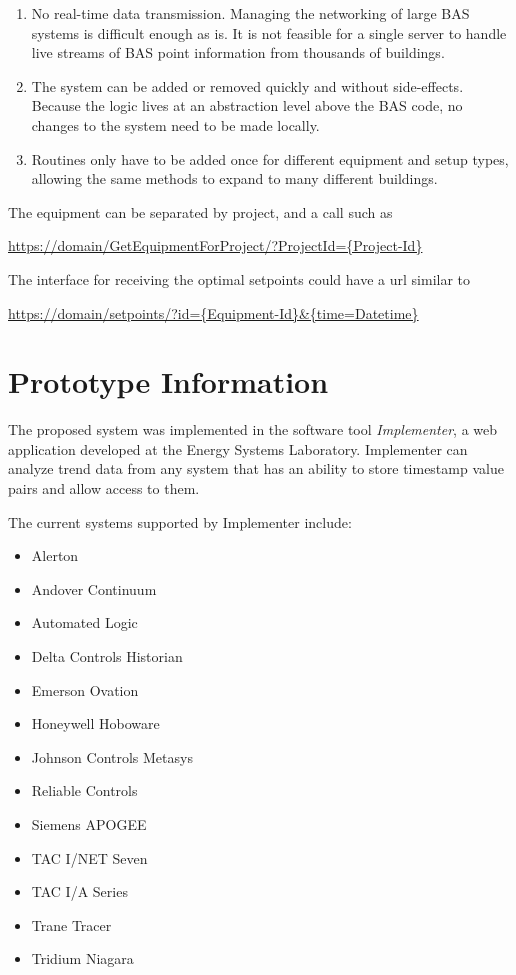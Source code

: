 \begin{enumerate}
    \item No real-time data transmission. Managing the networking of large BAS systems is difficult enough as is. It is not feasible for a single server to handle live streams of BAS point information from thousands of buildings. 

    \item The system can be added or removed quickly and without side-effects. Because the logic lives at an abstraction level above the BAS code, no changes to the system need to be made locally. 

    \item Routines only have to be added once for different equipment and setup types, allowing the same methods to expand to many different buildings. 


\end{enumerate}

The equipment can be separated by project, and a call such as

\url{https://domain/GetEquipmentForProject/?ProjectId={Project-Id}}

The interface for receiving the optimal setpoints could have a url
similar to 

\url{https://domain/setpoints/?id={Equipment-Id}\&{time=Datetime}}

\section{Prototype Information}

The proposed system was implemented in the software tool
\textit{Implementer}, a web application developed at the Energy Systems
Laboratory. Implementer can analyze trend data from any system that has
an ability to store timestamp value pairs and allow access to them. 

The current systems supported by Implementer include:

\begin{itemize}
    \item Alerton
    \item Andover Continuum
    \item Automated Logic
    \item Delta Controls Historian
    \item Emerson Ovation
    \item Honeywell Hoboware
    \item Johnson Controls Metasys
    \item Reliable Controls
    \item Siemens APOGEE
    \item TAC I/NET Seven
    \item TAC I/A Series
    \item Trane Tracer
    \item Tridium Niagara 
\end{itemize}


